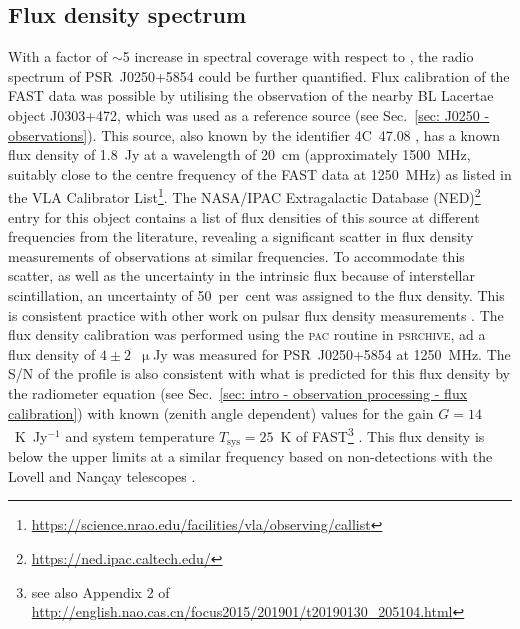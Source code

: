 \subsection{Flux density spectrum}
\label{sec: J0250 - analysis - flux}

With a factor of $\sim$5 increase in spectral coverage with respect to \citet{TBC+2018}, the radio spectrum of PSR~J0250+5854 could be further quantified. Flux calibration of the FAST data was possible by utilising the observation of the nearby BL Lacertae object J0303+472, which was used as a reference source (see Sec.~\ref{sec: J0250 - observations}). This source, also known by the identifier 4C~47.08 \citep{VVxx2006}, has a known flux density of 1.8~Jy at a wavelength of 20~cm (approximately 1500~MHz, suitably close to the centre frequency of the FAST data at 1250~MHz) as listed in the VLA Calibrator List\footnote{\url{https://science.nrao.edu/facilities/vla/observing/callist}}. The NASA/IPAC Extragalactic Database (NED)\footnote{\url{https://ned.ipac.caltech.edu/}} entry for this object contains a list of flux densities of this source at different frequencies from the literature, revealing a significant scatter in flux density measurements of observations at similar frequencies. To accommodate this scatter, as well as the uncertainty in the intrinsic flux because of interstellar scintillation, an uncertainty of 50~per~cent was assigned to the flux density. This is consistent practice with other work on pulsar flux density measurements \citep[e.g.][]{Sxxx1973}. The flux density calibration was performed using the \textsc{pac} routine in \textsc{psrchive}, ad a flux density of $4\pm2$~$\upmu$Jy was measured for PSR~J0250+5854 at 1250~MHz. The S/N of the profile is also consistent with what is predicted for this flux density by the radiometer equation (see Sec.~\ref{sec: intro - observation processing - flux calibration}) with known (zenith angle dependent) values for the gain $G = 14$~K~Jy$^{-1}$ and system temperature $T_\mathrm{sys} = 25$~K of FAST\footnote{see also Appendix 2 of \url{http://english.nao.cas.cn/focus2015/201901/t20190130_205104.html}} \citep{LWQ+2018}. This flux density is below the upper limits at a similar frequency based on non-detections with the Lovell and Nan\c{c}ay telescopes \citep[0.009~mJy and 0.015~mJy resepectively, ][]{TBC+2018}.

